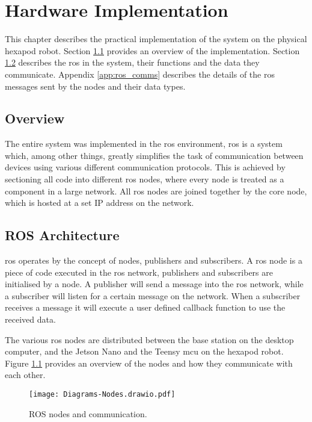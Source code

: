 \chapter{Hardware Implementation} \label{chap:hardware}
This chapter describes the practical implementation of the system on the physical hexapod robot. Section  \ref{sec:hardware_overview} provides an overview of the implementation. Section \ref{sec:ros_nodes} describes the \ac{ros} in the system, their functions and the data they communicate. Appendix \ref{app:ros_comms} describes the details of the \ac{ros} messages sent by the nodes and their data types.

\section{Overview} \label{sec:hardware_overview}
The entire system was implemented in the \acf{ros} environment, \ac{ros} is a system which, among other things, greatly simplifies the task of communication between devices using various different communication protocols. This is achieved by sectioning all code into different \ac{ros} nodes, where every node is treated as a component in a large network. All ros nodes are joined together by the core node, which is hosted at a set IP address on the network.

\section{ROS Architecture} \label{sec:ros_nodes}
    \ac{ros} operates by the concept of nodes, publishers and subscribers. A \ac{ros} node is a piece of code executed in the \ac{ros} network, publishers and subscribers are initialised by a node. A publisher will send a message into the \ac{ros} network, while a subscriber will listen for a certain message on the network. When a subscriber receives a message it will execute a user defined callback function to use the received data.

    The various \ac{ros} nodes are distributed between the base station on the desktop computer, and the Jetson Nano and the Teensy \ac{mcu} on the hexapod robot. Figure \ref{fig:nodes} provides an overview of the nodes and how they communicate with each other.

    \begin{figure}[h]
        \centering
        \texttt{[image: Diagrams-Nodes.drawio.pdf]}
        \caption{ROS nodes and communication.}
        \label{fig:nodes}
    \end{figure}

